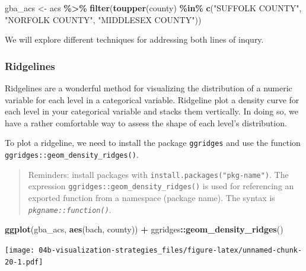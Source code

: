 \documentclass[
]{book}
\newenvironment{Shaded}{\begin{snugshade}}{\end{snugshade}}
\newcommand{\KeywordTok}[1]{\textcolor[rgb]{0.13,0.29,0.53}{\textbf{#1}}}
\newcommand{\NormalTok}[1]{#1}
\newcommand{\OperatorTok}[1]{\textcolor[rgb]{0.81,0.36,0.00}{\textbf{#1}}}
\newcommand{\StringTok}[1]{\textcolor[rgb]{0.31,0.60,0.02}{#1}}
\begin{document}
\begin{Shaded}
\begin{Highlighting}[]
\NormalTok{gba\_acs \textless{}{-}}\StringTok{ }\NormalTok{acs }\OperatorTok{\%\textgreater{}\%}\StringTok{ }
\StringTok{  }\KeywordTok{filter}\NormalTok{(}\KeywordTok{toupper}\NormalTok{(county) }\OperatorTok{\%in\%}\StringTok{ }\KeywordTok{c}\NormalTok{(}\StringTok{"SUFFOLK COUNTY"}\NormalTok{, }\StringTok{"NORFOLK COUNTY"}\NormalTok{, }\StringTok{"MIDDLESEX COUNTY"}\NormalTok{))}
\end{Highlighting}
\end{Shaded}

We will explore different techniques for addressing both lines of inqury.

\hypertarget{ridgelines}{%
\subsubsection{Ridgelines}\label{ridgelines}}

Ridgelines are a wonderful method for visualizing the distribution of a numeric variable for each level in a categorical variable. Ridgeline plot a density curve for each level in your categorical variable and stacks them vertically. In doing so, we have a rather comfortable way to assess the shape of each level's distribution.

To plot a ridgeline, we need to install the package \texttt{ggridges} and use the function \texttt{ggridges::geom\_density\_ridges()}.

\begin{quote}
Reminders: install packages with \texttt{install.packages("pkg-name")}. The expression \texttt{ggridges::geom\_density\_ridges()} is used for referencing an exported function from a namespace (package name). The syntax is \emph{\texttt{pkgname::function()}}.
\end{quote}

\begin{Shaded}
\begin{Highlighting}[]
\KeywordTok{ggplot}\NormalTok{(gba\_acs, }\KeywordTok{aes}\NormalTok{(bach, county)) }\OperatorTok{+}
\StringTok{  }\NormalTok{ggridges}\OperatorTok{::}\KeywordTok{geom\_density\_ridges}\NormalTok{() }
\end{Highlighting}
\end{Shaded}

\texttt{[image: 04b-visualization-strategies\_files/figure-latex/unnamed-chunk-20-1.pdf]}
\end{document}

